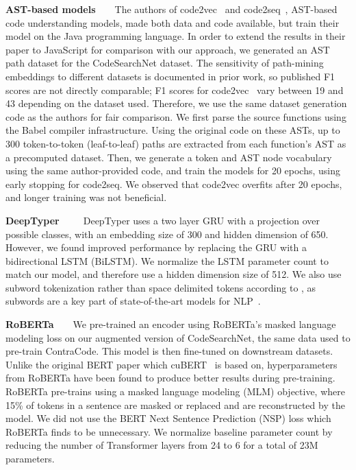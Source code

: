 \documentclass[11pt]{article}
\newcommand{\ours}[0]{ContraCode}
\begin{document}
\textbf{AST-based models}~~~~The authors of code2vec~\citep{alon2019code2vec} and code2seq~\citep{alon2018code2seq}, AST-based code understanding models, made both data and code available, but train their model on the Java programming language. In order to extend the results in their paper to JavaScript for comparison with our approach, we generated an AST path dataset for the CodeSearchNet dataset.
The sensitivity of path-mining embeddings to different datasets is documented in prior work, so published F1 scores are not directly comparable; F1 scores for code2vec~\citep{alon2019code2vec} vary between 19 \citep{alon2018code2seq} and 43 \citep{alon2019code2vec} depending on the dataset used. Therefore, we use the same dataset generation code as the authors for fair comparison. We first parse the source functions using the Babel compiler infrastructure. Using the original code on these ASTs, up to 300 token-to-token (leaf-to-leaf) paths are extracted from each function's AST as a precomputed dataset. Then, we generate a token and AST node vocabulary using the same author-provided code, and train the models for 20 epochs, using early stopping for code2seq. We observed that code2vec overfits after 20 epochs, and longer training was not beneficial.

\textbf{DeepTyper}~\citep{hellendoorn2018deep}~~~~DeepTyper uses a two layer GRU with a projection over possible classes, with an embedding size of 300 and hidden dimension of 650. However, we found improved performance by replacing the GRU with a bidirectional LSTM (BiLSTM). We normalize the LSTM parameter count to match our model, and therefore use a hidden dimension size of 512. We also use subword tokenization rather than space delimited tokens according to \citet{kudo2018subword}, as subwords are a key part of state-of-the-art models for NLP~\citep{sennrich2015neural}.

\textbf{RoBERTa}~~~~We pre-trained an encoder using RoBERTa's masked language modeling loss on our augmented version of CodeSearchNet, the same data used to pre-train \ours{}. This model is then fine-tuned on downstream datasets. Unlike the original BERT paper which cuBERT~\citep{cuBERT} is based on, hyperparameters from RoBERTa have been found to produce better results during pre-training. RoBERTa pre-trains using a masked language modeling (MLM) objective, where 15\% of tokens in a sentence are masked or replaced and are reconstructed by the model. We did not use the BERT Next Sentence Prediction (NSP) loss which RoBERTa finds to be unnecessary. We normalize baseline parameter count by reducing the number of Transformer layers from 24 to 6 for a total of 23M parameters.
\end{document}
